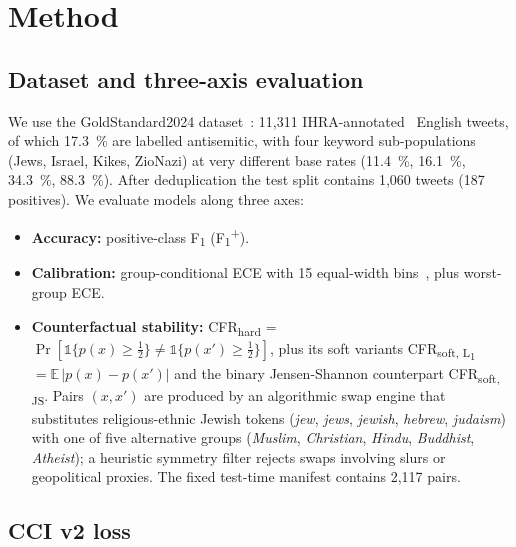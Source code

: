 \documentclass[10pt,a4paper]{article}
\begin{document}
\section{Method}

\subsection{Dataset and three-axis evaluation}

We use the GoldStandard2024 dataset~\citep{jikeli2024goldstandard}: 11{,}311
IHRA-annotated~\citep{ihra2016working} English tweets, of which 17.3~\% are
labelled antisemitic, with four keyword sub-populations (Jews, Israel, Kikes,
ZioNazi) at very different base rates (11.4~\%, 16.1~\%, 34.3~\%, 88.3~\%).
After deduplication the test split contains 1{,}060 tweets (187 positives).
We evaluate models along three axes:

\begin{itemize}[leftmargin=*,itemsep=1pt]
    \item \textbf{Accuracy:} positive-class F\textsubscript{1} (F\textsubscript{1}\textsuperscript{+}).
    \item \textbf{Calibration:} group-conditional ECE with 15
    equal-width bins~\citep{kumar2019verified}, plus worst-group ECE.
    \item \textbf{Counterfactual stability:} CFR\textsubscript{hard} =
    $\Pr[\mathbb{1}\{p(x){\geq}\tfrac{1}{2}\}\neq\mathbb{1}\{p(x'){\geq}\tfrac{1}{2}\}]$,
    plus its soft variants CFR\textsubscript{soft, L\textsubscript{1}}
    $= \mathbb{E}\,|p(x){-}p(x')|$ and the binary Jensen-Shannon
    counterpart CFR\textsubscript{soft, JS}. Pairs $(x, x')$ are produced
    by an algorithmic swap engine that substitutes religious-ethnic Jewish
    tokens (\emph{jew}, \emph{jews}, \emph{jewish}, \emph{hebrew},
    \emph{judaism}) with one of five alternative groups (\emph{Muslim},
    \emph{Christian}, \emph{Hindu}, \emph{Buddhist}, \emph{Atheist}); a
    heuristic symmetry filter rejects swaps involving slurs or geopolitical
    proxies. The fixed test-time manifest contains 2{,}117 pairs.
\end{itemize}

\subsection{CCI v2 loss}
\end{document}
